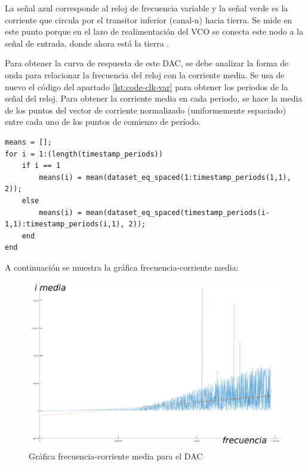 \documentclass[12pt]{report} %
\begin{document}
	La señal azul corresponde al reloj de frecuencia variable y la señal verde es la corriente que circula por el transitor inferior (canal-n) hacia tierra. Se mide en este punto porque en el lazo de realimentación del VCO se conecta este nodo a la señal de entrada, donde ahora está la tierra .
	
	Para obtener la curva de respuesta de este DAC, se debe analizar la forma de onda para relacionar la frecuencia del reloj con la corriente media. Se usa de nuevo el código del apartado \ref{lst:code-clk-var} para obtener los periodos de la señal del reloj. Para obtener la corriente media en cada periodo, se hace la media de los puntos del vector de corriente normalizado (uniformemente espaciado) entre cada uno de los puntos de comienzo de período.
	
\begin{lstlisting}[caption={Código en Matlab/Octave para el cálculo de la corriente media por cada periodo}, label={code-dac-i-mean}]
means = [];
for i = 1:(length(timestamp_periods))
	if i == 1
		means(i) = mean(dataset_eq_spaced(1:timestamp_periods(1,1), 2));
	else
		means(i) = mean(dataset_eq_spaced(timestamp_periods(i-1,1):timestamp_periods(i,1), 2));
	end
end
\end{lstlisting}

	A continuación se muestra la gráfica frecuencia-corriente media:
	
	\begin{figure}[H]
		\includegraphics[width=1\textwidth]{dac-sim-graph.png}
		\caption[Gráfica frecuencia-corriente media para el DAC]{Gráfica frecuencia-corriente media para el DAC}
		\label{fig:dac-sim-graph.png}
	\end{figure}
\end{document}
